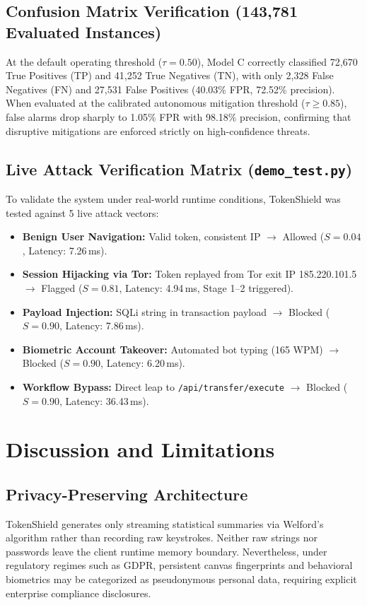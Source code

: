 \documentclass[conference]{IEEEtran}
\begin{document}
\subsection{Confusion Matrix Verification (143,781 Evaluated Instances)}
At the default operating threshold ($\tau = 0.50$), Model C correctly classified 72,670 True Positives (TP) and 41,252 True Negatives (TN), with only 2,328 False Negatives (FN) and 27,531 False Positives (40.03\% FPR, 72.52\% precision). When evaluated at the calibrated autonomous mitigation threshold ($\tau \ge 0.85$), false alarms drop sharply to 1.05\% FPR with 98.18\% precision, confirming that disruptive mitigations are enforced strictly on high-confidence threats.

\subsection{Live Attack Verification Matrix (\texttt{demo\_test.py})}
To validate the system under real-world runtime conditions, TokenShield was tested against 5 live attack vectors:
\begin{itemize}
    \item \textbf{Benign User Navigation:} Valid token, consistent IP $\to$ Allowed ($S = 0.04$, Latency: 7.26\,ms).
    \item \textbf{Session Hijacking via Tor:} Token replayed from Tor exit IP 185.220.101.5 $\to$ Flagged ($S = 0.81$, Latency: 4.94\,ms, Stage 1--2 triggered).
    \item \textbf{Payload Injection:} SQLi string in transaction payload $\to$ Blocked ($S = 0.90$, Latency: 7.86\,ms).
    \item \textbf{Biometric Account Takeover:} Automated bot typing (165 WPM) $\to$ Blocked ($S = 0.90$, Latency: 6.20\,ms).
    \item \textbf{Workflow Bypass:} Direct leap to \texttt{/api/transfer/execute} $\to$ Blocked ($S = 0.90$, Latency: 36.43\,ms).
\end{itemize}

\section{Discussion and Limitations}

\subsection{Privacy-Preserving Architecture}
TokenShield generates only streaming statistical summaries via Welford's algorithm rather than recording raw keystrokes. Neither raw strings nor passwords leave the client runtime memory boundary. Nevertheless, under regulatory regimes such as GDPR, persistent canvas fingerprints and behavioral biometrics may be categorized as pseudonymous personal data, requiring explicit enterprise compliance disclosures.
\end{document}
